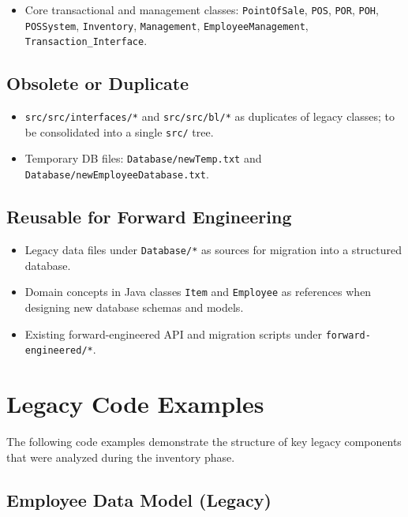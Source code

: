 \begin{itemize}[leftmargin=1.2cm]
  \item Core transactional and management classes:
        \texttt{PointOfSale}, \texttt{POS}, \texttt{POR}, \texttt{POH},
        \texttt{POSSystem}, \texttt{Inventory}, \texttt{Management},
        \texttt{EmployeeManagement}, \texttt{Transaction\_Interface}.
\end{itemize}

\subsection*{Obsolete or Duplicate}

\begin{itemize}[leftmargin=1.2cm]
  \item \texttt{src/src/interfaces/*} and \texttt{src/src/bl/*} as
        duplicates of legacy classes; to be consolidated into a single
        \texttt{src/} tree.
  \item Temporary DB files:
        \texttt{Database/newTemp.txt} and
        \texttt{Database/newEmployeeDatabase.txt}.
\end{itemize}

\subsection*{Reusable for Forward Engineering}

\begin{itemize}[leftmargin=1.2cm]
  \item Legacy data files under \texttt{Database/*} as sources for
        migration into a structured database.
  \item Domain concepts in Java classes \texttt{Item} and \texttt{Employee}
        as references when designing new database schemas and models.
  \item Existing forward-engineered API and migration scripts under
        \texttt{forward-engineered/*}.
\end{itemize}

\section{Legacy Code Examples}

The following code examples demonstrate the structure of key legacy components
that were analyzed during the inventory phase.

\subsection{Employee Data Model (Legacy)}

